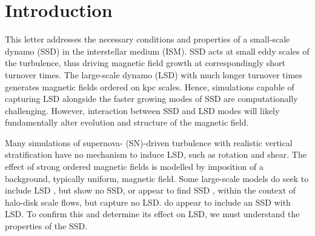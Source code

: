 \documentclass[preprint2]{aastex63}
\newcommand{\fg}[1]{\textcolor{midgreen}{#1}}
\begin{document}
\section{Introduction}\label{sec:intro}


 This letter addresses the necessary conditions and properties of a small-scale
 dynamo (SSD) in the interstellar medium (ISM).
 SSD acts at small eddy scales of the turbulence, thus driving magnetic field
 growth at correspondingly short turnover times.
 \fg{The large-scale dynamo (LSD) with much longer turnover times generates
 magnetic fields ordered on kpc scales.}
 Hence, simulations capable of capturing LSD alongside the faster growing modes
 of SSD are computationally challenging.
 However, \fg{interaction between SSD and LSD modes will likely
 fundamentally alter} evolution and structure of the magnetic field.

 Many simulations of supernova- (SN)-driven turbulence with realistic vertical
 stratification \citep[e.g.,][]{deAvillez:2005,PO07,Hill:2012a,HI14} have no
 mechanism to induce LSD, such as rotation and shear.
 The effect of strong ordered magnetic fields is modelled by
 imposition of a background, typically uniform, magnetic field.
 \fg{Some large-scale models do seek to include LSD 
 \citep[e.g.,][]{Korpi:1999b,Gressel:2008,HWK09,WA09,Pakmor17,
 GE20}, but show no SSD, or appear to find SSD 
 \citep[e.g.,][]{RT16,RT17,RT17a,SBADMN19}, within the context of halo-disk
 scale flows, but capture no LSD.}
 \citet{Gent:2013b,EGSFB16} do appear to include an \fg{SSD with LSD}.
 To confirm this and determine its effect on LSD, we must understand the
 properties of the SSD.
     
\end{document}
